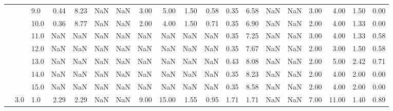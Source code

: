 \begin{tabular}{lllrrrrrrrrrrrrrrrr}
      &     & 9.0  &      0.44 &       8.23 &               NaN &                NaN & 3.00 &   5.00 &             1.50 &                         0.58 &      0.35 &       6.58 &               NaN &                NaN & 3.00 &   4.00 &             1.50 &                         0.00 \\
      &     & 10.0 &      0.36 &       8.77 &               NaN &                NaN & 2.00 &   4.00 &             1.50 &                         0.71 &      0.35 &       6.90 &               NaN &                NaN & 2.00 &   4.00 &             1.33 &                         0.00 \\
      &     & 11.0 &       NaN &        NaN &               NaN &                NaN &  NaN &    NaN &              NaN &                          NaN &      0.35 &       7.25 &               NaN &                NaN & 3.00 &   4.00 &             1.33 &                         0.58 \\
      &     & 12.0 &       NaN &        NaN &               NaN &                NaN &  NaN &    NaN &              NaN &                          NaN &      0.35 &       7.67 &               NaN &                NaN & 2.00 &   3.00 &             1.50 &                         0.58 \\
      &     & 13.0 &       NaN &        NaN &               NaN &                NaN &  NaN &    NaN &              NaN &                          NaN &      0.43 &       8.08 &               NaN &                NaN & 2.00 &   5.00 &             2.42 &                         0.71 \\
      &     & 14.0 &       NaN &        NaN &               NaN &                NaN &  NaN &    NaN &              NaN &                          NaN &      0.35 &       8.23 &               NaN &                NaN & 2.00 &   4.00 &             2.00 &                         0.00 \\
      &     & 15.0 &       NaN &        NaN &               NaN &                NaN &  NaN &    NaN &              NaN &                          NaN &      0.35 &       8.58 &               NaN &                NaN & 2.00 &   4.00 &             2.00 &                         0.00 \\
      & 3.0 & 1.0  &      2.29 &       2.29 &               NaN &                NaN & 9.00 &  15.00 &             1.55 &                         0.95 &      1.71 &       1.71 &               NaN &                NaN & 7.00 &  11.00 &             1.40 &                         0.89 \\

\end{tabular}
